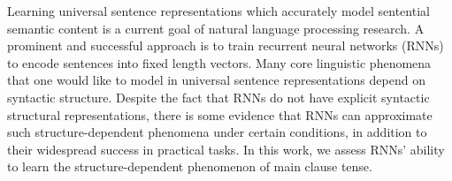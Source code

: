 Learning universal sentence representations which accurately model sentential semantic content is a current goal of natural language processing research. A prominent and successful approach is to train recurrent neural networks (RNNs) to encode sentences into fixed length vectors. Many core linguistic phenomena that one would like to model in universal sentence representations depend on syntactic structure. Despite the fact that RNNs do not have explicit syntactic structural representations, there is some evidence that RNNs can approximate such structure-dependent phenomena under certain conditions, in addition to their widespread success in practical tasks. In this work, we assess RNNs' ability to learn the structure-dependent phenomenon of main clause tense.
